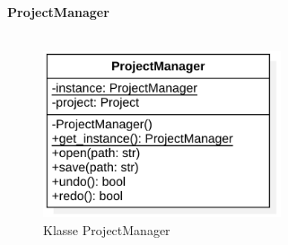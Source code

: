 \documentclass{article}
\begin{document}
\begin{itemize}
\newpage
\textbf{\large{ProjectManager}}\\\\

\begin{figure}[H]%
    \centering
    \includegraphics[width=7cm]{entwurf/Floriane/ProjectManager.png}
    \caption{Klasse ProjectManager}
\end{figure}


\end{itemize}
\end{document}
